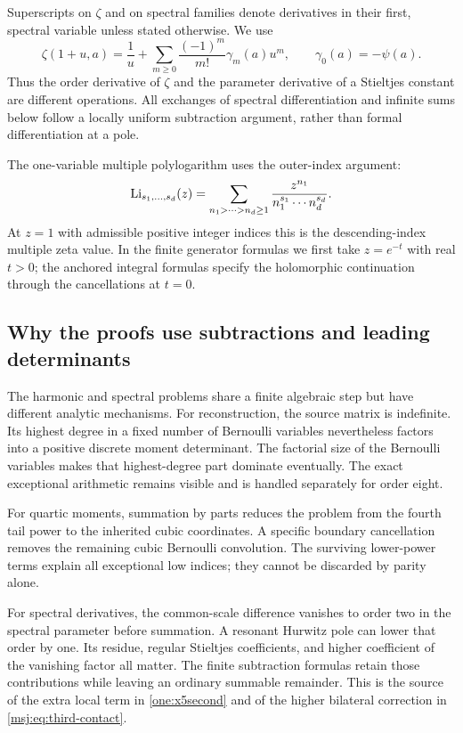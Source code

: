 Superscripts on $\zeta$ and on spectral families denote derivatives
in their first, spectral variable unless stated otherwise.  We use
\[
 \zeta(1+u,a)=\frac1u+
       \sum_{m\ge0}\frac{(-1)^m}{m!}\gamma_m(a)u^m,
 \qquad \gamma_0(a)=-\psi(a).
\]
Thus the order derivative of $\zeta$ and the parameter derivative of a
Stieltjes constant are different operations.  All exchanges of spectral
differentiation and infinite sums below follow a locally uniform
subtraction argument, rather than formal differentiation at a pole.

The one-variable multiple polylogarithm uses the outer-index argument:
\[
 \operatorname{Li}_{s_1,\ldots,s_d}(z)=
 \sum_{n_1>\cdots>n_d\ge1}
       \frac{z^{n_1}}{n_1^{s_1}\cdots n_d^{s_d}}.
\]
At $z=1$ with admissible positive integer indices this is the
descending-index multiple zeta value.  In the finite generator formulas
we first take $z=e^{-t}$ with real $t>0$; the anchored integral formulas
specify the holomorphic continuation through the cancellations at $t=0$.

\subsection{Why the proofs use subtractions and leading determinants}

The harmonic and spectral problems share a finite algebraic step but have
different analytic mechanisms.  For reconstruction, the source matrix is
indefinite.  Its highest degree in a fixed number of Bernoulli variables
nevertheless factors into a positive discrete moment determinant.  The
factorial size of the Bernoulli variables makes that highest-degree part
dominate eventually.  The exact exceptional arithmetic remains visible
and is handled separately for order eight.

For quartic moments, summation by parts reduces the problem from the
fourth tail power to the inherited cubic coordinates.  A specific
boundary cancellation removes the remaining cubic Bernoulli convolution.
The surviving lower-power terms explain all exceptional low indices;
they cannot be discarded by parity alone.

For spectral derivatives, the common-scale difference vanishes to order
two in the spectral parameter before summation.  A resonant Hurwitz
pole can lower that order by one.  Its residue, regular Stieltjes
coefficients, and higher coefficient of the vanishing factor all matter.
The finite subtraction formulas retain those contributions while leaving
an ordinary summable remainder.  This is the source of the extra local
term in \eqref{one:x5second} and of the higher bilateral correction in
\eqref{msj:eq:third-contact}.
